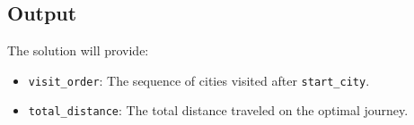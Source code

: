\documentclass{article}
\begin{document}
\subsection*{Output}
The solution will provide:
\begin{itemize}
    \item \texttt{visit\_order}: The sequence of cities visited after \texttt{start\_city}.
    \item \texttt{total\_distance}: The total distance traveled on the optimal journey.
\end{itemize}
\end{document}
